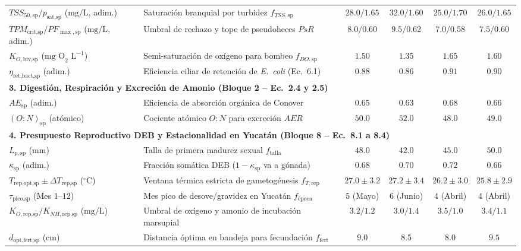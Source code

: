 \documentclass[11pt,letterpaper]{article}
\begin{document}
\begin{table}[htbp]
{\begin{tabular}{l l c c c c}
$TSS_{50,\text{sp}} / p_{\text{sat,sp}}$ ($\text{mg/L}$, adim.) & Saturación branquial por turbidez $f_{TSS,\text{sp}}$ & $28.0 / 1.65$ & $32.0 / 1.60$ & $25.0 / 1.70$ & $26.0 / 1.65$ \\
$TPM_{\text{crit,sp}} / PF_{\max,\text{sp}}$ ($\text{mg/L}$, adim.) & Umbral de rechazo y tope de pseudoheces $PsR$ & $8.0 / 0.60$ & $9.5 / 0.62$ & $7.0 / 0.58$ & $7.5 / 0.60$ \\
$K_{O,\text{biv,sp}}$ ($\text{mg O}_2\text{ L}^{-1}$) & Semi-saturación de oxígeno para bombeo $f_{DO,\text{sp}}$ & $1.50$ & $1.35$ & $1.65$ & $1.60$ \\
$\eta_{\text{ret,bact,sp}}$ (adim.) & Eficiencia ciliar de retención de \textit{E.\ coli} (Ec.\ 6.1) & $0.88$ & $0.86$ & $0.91$ & $0.90$ \\
\hline
\multicolumn{6}{l}{\textbf{3. Digestión, Respiración y Excreción de Amonio (Bloque 2 -- Ec.\ 2.4 y 2.5)}} \\
\hline
$AE_{\text{sp}}$ (adim.) & Eficiencia de absorción orgánica de Conover & $0.65$ & $0.63$ & $0.68$ & $0.66$ \\
$(O:N)_{\text{sp}}$ (atómico) & Cociente atómico $O:N$ para excreción $AER$ & $50.0$ & $52.0$ & $48.0$ & $49.0$ \\
\hline
\multicolumn{6}{l}{\textbf{4. Presupuesto Reproductivo DEB y Estacionalidad en Yucatán (Bloque 8 -- Ec.\ 8.1 a 8.4)}} \\
\hline
$L_{p,\text{sp}}$ ($\text{mm}$) & Talla de primera madurez sexual $f_{\text{talla}}$ & $48.0$ & $42.0$ & $45.0$ & $50.0$ \\
$\kappa_{\text{sp}}$ (adim.) & Fracción somática DEB ($1-\kappa_{\text{sp}}$ va a gónada) & $0.68$ & $0.70$ & $0.72$ & $0.66$ \\
$T_{\text{rep,opt,sp}} \pm \Delta T_{\text{rep,sp}}$ ($^\circ\text{C}$) & Ventana térmica estricta de gametogénesis $f_{T,\text{rep}}$ & $27.0 \pm 3.2$ & $27.2 \pm 3.4$ & $26.2 \pm 3.0$ & $25.8 \pm 2.9$ \\
$\tau_{\text{pico,sp}}$ (Mes $1\text{--}12$) & Mes pico de desove/gravidez en Yucatán $f_{\text{época}}$ & $5$ (Mayo) & $6$ (Junio) & $4$ (Abril) & $4$ (Abril) \\
$K_{O,\text{rep,sp}} / K_{NH,\text{rep,sp}}$ ($\text{mg/L}$) & Umbral de oxígeno y amonio de incubación marsupial & $3.2 / 1.2$ & $3.0 / 1.4$ & $3.5 / 1.0$ & $3.4 / 1.1$ \\
$d_{\text{opt,fert,sp}}$ ($\text{cm}$) & Distancia óptima en bandeja para fecundación $f_{\text{fert}}$ & $9.0$ & $8.5$ & $8.0$ & $9.5$ \\
\hline
\end{tabular}%
}
\end{table}
\end{document}

